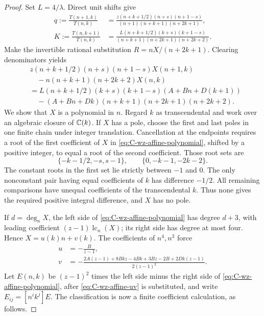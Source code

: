 \begin{proof}
Set $L=4/\lambda$.  Direct unit shifts give
\begin{align*}
 q:=\frac{T(n+1,k)}{T(n,k)}
 &=\frac{z(n+k+1/2)(n+s)(n+1-s)}
 {(n+1)(n+k+1)(n+2k+1)},\\
 K:=\frac{T(n,k+1)}{T(n,k)}
 &=\frac{L(n+k+1/2)(k+s)(k+1-s)}
 {(n+k+1)(n+2k+1)(n+2k+2)}.
\end{align*}
Make the invertible rational substitution $R=nX/(n+2k+1)$.
Clearing denominators yields
\begin{equation}\label{eq:C-wz-affine-polynomial}
\begin{split}
 &z(n+k+1/2)(n+s)(n+1-s)X(n+1,k)\\
 &\quad-n(n+k+1)(n+2k+2)X(n,k)\\
 &=L(n+k+1/2)(k+s)(k+1-s)(A+Bn+D(k+1))\\
 &\quad-(A+Bn+Dk)(n+k+1)(n+2k+1)(n+2k+2).
\end{split}
\end{equation}
We show that $X$ is a polynomial in $n$.  Regard $k$ as
transcendental and work over an algebraic closure of $\mathbb C(k)$.
If $X$ has a pole, choose the first and last poles in one finite
chain under integer translation.  Cancellation at the endpoints
requires a root of the first coefficient of $X$ in
\eqref{eq:C-wz-affine-polynomial}, shifted by a positive integer,
to equal a root of the second coefficient.  Those root sets are
\[
 \{-k-1/2,-s,s-1\},\qquad \{0,-k-1,-2k-2\}.
\]
The constant roots in the first set lie strictly between $-1$ and
$0$.  The only nonconstant pair having equal coefficients of $k$
has difference $-1/2$.  All remaining comparisons have unequal
coefficients of the transcendental $k$.  Thus none gives the required
positive integral difference, and $X$ has no pole.

If $d=\deg_nX$, the left side of
\eqref{eq:C-wz-affine-polynomial} has degree $d+3$, with leading
coefficient $(z-1)\operatorname{lc}_n(X)$; its right side has degree
at most four.  Hence $X=u(k)n+v(k)$.  The coefficients of $n^4,n^3$
force
\begin{equation}\label{eq:C-wz-affine-uv}
\begin{split}
 u&=-\frac B{z-1},\\
 v&=-\frac{2A(z-1)+8Bkz-4Bk+3Bz-2B+2Dk(z-1)}
 {2(z-1)^2}.
\end{split}
\end{equation}
Let $E(n,k)$ be $(z-1)^2$ times the left side minus the right side
of \eqref{eq:C-wz-affine-polynomial}, after
\eqref{eq:C-wz-affine-uv} is substituted, and write
$E_{ij}=[n^ik^j]E$.  The classification is now a finite coefficient
calculation, as follows.


\end{proof}
